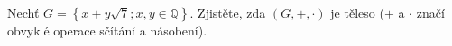Nechť $G=\left \{ x+y\sqrt{7};x,y \in\mathbb{Q} \right \}$. Zjistěte, zda $\left
( G,+,\cdot  \right )$ je těleso ($+$ a $\cdot$ značí obvyklé operace sčítání a
násobení).
